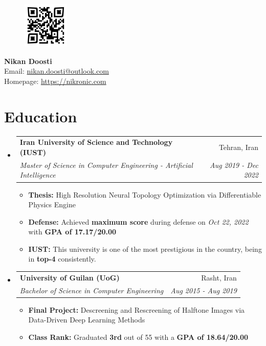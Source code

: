 \documentclass[letterpaper,11pt]{article}
\makeatletter
\newcommand{\resumeItem}[1]{
  \item\small{
    {#1 \vspace{0pt}}
  }
}
\newcommand{\resumeSubheadingF}[4]{
  \item
    \begin{tabular*}{0.97\textwidth}{l@{\extracolsep{\fill}}r}
      \textbf{#1} & #2 \\ 
      \textit{\small#3} & \textit{\small #4} \\
    \end{tabular*}\vspace{-5pt}
}
\newcommand{\resumeSubHeadingListStart}{\begin{itemize}[leftmargin=*]}
\newcommand{\resumeSubHeadingListEnd}{\end{itemize}}
\newcommand{\resumeItemListStart}{\begin{itemize}}
\newcommand{\resumeItemListEnd}{\end{itemize}\vspace{-5pt}}
\makeatother
\begin{document}
\begin{figure} %
  \vspace{-\baselineskip} %
  \includegraphics[width=2.2cm, height=2.2cm]{qrcode.png}
\end{figure}

\textbf{{\Large Nikan Doosti}} \\
Email: \href{mailto:nikan.doosti@outlook.com}{nikan.doosti@outlook.com}\\
Homepage: \href{https://nikronic.com/}{https://nikronic.com}

\hspace{0cm} %
\section{Education}
 \resumeSubHeadingListStart
   \resumeSubheadingF
     {Iran University of Science and Technology (IUST)}{Tehran, Iran}
     {Master of Science in Computer Engineering - Artificial Intelligence}{Aug 2019 - Dec 2022}
      \resumeItemListStart
        \resumeItem{\textbf{Thesis:} High Resolution Neural Topology Optimization via Differentiable Physics Engine}
        \resumeItem{\textbf{Defense:} Achieved \textbf{maximum score} during defense on \textit{Oct 22, 2022} with \textbf{GPA of 17.17/20.00}}
        \resumeItem{\textbf{IUST:} This university is one of the most prestigious in the country, being in \textbf{top-4} consistently.}
      \resumeItemListEnd
   \resumeSubheadingF
     {University of Guilan (UoG)}{Rasht, Iran}
     {Bachelor of Science in Computer Engineering}{Aug 2015 - Aug 2019}
     \resumeItemListStart
        \resumeItem{\textbf{Final Project:} Descreening and Rescreening of Halftone Images via Data-Driven Deep Learning Methods}
        \resumeItem{\textbf{Class Rank:} Graduated \textbf{3rd} out of 55 with a \textbf{GPA of 18.64/20.00}}
      \resumeItemListEnd
 \resumeSubHeadingListEnd

\end{document}
